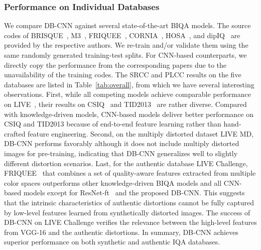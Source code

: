 \documentclass[journal]{IEEEtran}
\begin{document}
\subsubsection{ Performance on Individual Databases}\label{subsubsec:overall_results}
We compare DB-CNN against several state-of-the-art BIQA models. The source codes of BRISQUE~\cite{mittal2012no}, M3~\cite{xue2014blind}, FRIQUEE~\cite{ghadiyaram2017perceptual}, CORNIA~\cite{ye2012unsupervised}, HOSA~\cite{xu2016blind}, and dipIQ~\cite{ma2017dipiq} are provided by the respective authors. We re-train and/or validate them using the same randomly generated training-test splits.  For CNN-based counterparts, we directly copy the performance from the corresponding papers due to the unavailability of the training codes. The SRCC and PLCC results on the five databases are listed in Table~\ref{tab:overall}, from which we have several interesting observations.  First, while all competing models achieve comparable performance on LIVE~\cite{sheikh2006statistical}, their results on CSIQ~\cite{larson2010most} and TID2013~\cite{ponomarenko2013color} are rather diverse. Compared with knowledge-driven models, CNN-based models deliver better performance on CSIQ and TID2013 because of end-to-end feature learning rather than hand-crafted feature engineering.  Second, on the multiply distorted dataset LIVE MD, DB-CNN performs favorably although it does not include multiply distorted images for pre-training, indicating that DB-CNN generalizes well to slightly different distortion scenarios. Last, for the authentic database LIVE Challenge, FRIQUEE~\cite{ghadiyaram2017perceptual} that combines a set of quality-aware features extracted from multiple color spaces outperforms other knowledge-driven BIQA models and all CNN-based models except for ResNet-ft~\cite{kim2017deep} and the proposed DB-CNN. This suggests that the intrinsic characteristics of authentic distortions cannot be fully captured by low-level features learned from synthetically distorted images. The success of DB-CNN on LIVE Challenge verifies the relevance between the high-level features from VGG-16 and the authentic distortions. In summary, DB-CNN achieves superior performance on both synthetic and authentic IQA databases.
\end{document}

